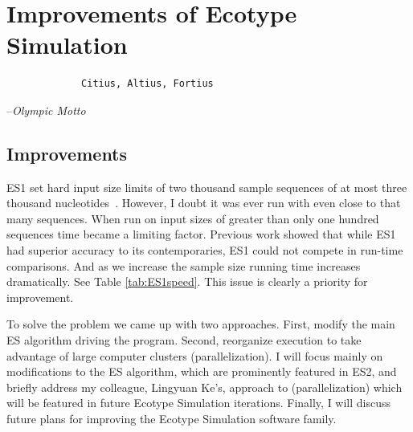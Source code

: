 \gobbletocpage
\chapter{Improvements of Ecotype Simulation}
\restoretocpage

\begin{shadequote}
\begin{center}
    \Large\begin{verbatim} 
             Citius, Altius, Fortius
 \end{verbatim}  
\end{center}
\par--\emph{Olympic Motto}
\end{shadequote}


\section{Improvements}
ES1 set hard input size limits of two thousand sample sequences of at most three thousand nucleotides~\cite{koeppel2008identifying}.
However, I doubt it was ever run with even close to that many sequences.
When run on input sizes of greater than only one hundred sequences time became a limiting factor.
Previous work showed that while ES1 had superior  accuracy to its contemporaries, ES1 could not compete in run-time comparisons.
And as we increase the sample size running time increases dramatically.
See Table \ref{tab:ES1speed}.
This issue is clearly a priority for improvement.

To solve the problem we came up with two approaches.
First, modify the main ES algorithm driving the program.
Second, reorganize execution to take advantage of large computer clusters (parallelization).
I will focus mainly on modifications to the ES algorithm, which are prominently featured in ES2, and briefly address my colleague, Lingyuan Ke's, approach to (parallelization) which will be featured in future Ecotype Simulation iterations.
Finally, I will discuss future plans for improving the Ecotype Simulation software family.


